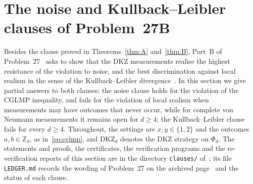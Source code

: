 \documentclass[11pt]{amsart}
\theoremstyle{definition}
\theoremstyle{remark}
\numberwithin{equation}{section}
\newcommand{\Z}{\mathbb{Z}}
\newcommand{\DKZ}{\mathrm{DKZ}}
\begin{document}
\section{The noise and Kullback--Leibler clauses of Problem~27B}\label{sec:clauses}

Besides the clause proved in Theorems~\ref{thm:A} and~\ref{thm:B}, Part~B of Problem~27~\cite{OQP} asks to show that
the DKZ measurements realise the highest resistance of the violation to noise, and the best discrimination against
local realism in the sense of the Kullback--Leibler divergence~\cite{vDGG}. In this section we give partial answers to
both clauses: the noise clause holds for the violation of the CGLMP inequality, and fails for the violation of local
realism when measurements may have outcomes that never occur, while for complete von Neumann measurements it remains
open for $d\ge4$; the Kullback--Leibler clause fails for every $d\ge4$. Throughout, the settings are $x,y\in\{1,2\}$
and the outcomes $a,b\in\Z_d$, as in~\eqref{eq:cglmp}, and $\DKZ_d$ denotes the DKZ strategy on $\Phi_d$. The
statements and proofs, the certificates, the verification programs and the re-verification reports of this section are
in the directory \texttt{clauses/} of~\cite{repo-oqp27}; its file \texttt{LEDGER.md} records the wording of Problem~27
on the archived page~\cite{OQP} and the status of each clause.
\end{document}
